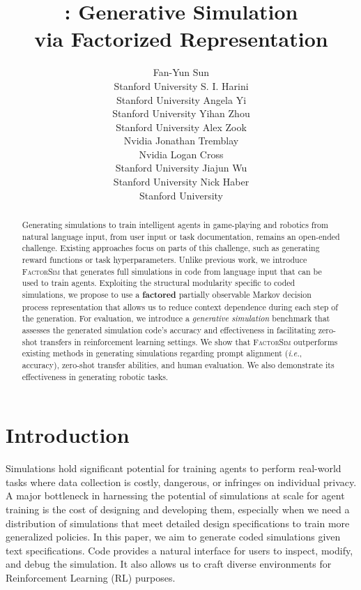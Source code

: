 \documentclass{article}
\title{\method: Generative Simulation\\ via Factorized Representation}
\author{Fan-Yun Sun\\Stanford University \And 
S. I. Harini\\Stanford University \And 
Angela Yi\\Stanford University \And Yihan Zhou\\Stanford University \AND
Alex Zook\\Nvidia  \And Jonathan Tremblay\\Nvidia \And 
Logan Cross\\Stanford University \AND
Jiajun Wu\\Stanford University \And 
Nick Haber\\Stanford University 
}
\theoremstyle{plain}
\theoremstyle{definition}
\theoremstyle{remark}
\newcommand{\method}{\textsc{FactorSim}\xspace}
\begin{document}
\maketitle


\begin{abstract}








Generating simulations to train intelligent agents in game-playing and robotics from natural language input, 
from user input or task documentation, remains an open-ended challenge. 
Existing approaches focus on parts of this
challenge, such as generating reward functions or task hyperparameters.
Unlike previous work, we introduce \method that generates full simulations in code from language input that can be used to train agents. 
Exploiting the structural modularity specific to coded simulations, we propose to use a \textbf{factored} partially observable Markov decision process representation that allows us to reduce context dependence during each step of the generation.
For evaluation, we introduce a \textit{generative simulation} benchmark that assesses the generated simulation code's accuracy and effectiveness in facilitating zero-shot transfers in reinforcement learning settings.
We show that \method outperforms existing methods in generating simulations regarding prompt alignment (\textit{i.e.}, accuracy), zero-shot transfer abilities, and human evaluation. We also demonstrate its effectiveness in generating robotic tasks.

\end{abstract}

\section{Introduction}






Simulations hold significant potential for training agents to perform real-world tasks where data collection is costly, dangerous, or infringes on individual privacy. 
A major bottleneck in harnessing the potential of simulations at scale for agent training is the cost of designing and developing them, especially when we need a distribution of simulations that meet detailed design specifications to train more generalized policies. 
In this paper, we aim to generate coded simulations given text specifications. Code provides a natural interface for users to inspect, modify, and debug the simulation. It also allows us to craft diverse environments for Reinforcement Learning (RL) purposes.
\end{document}
